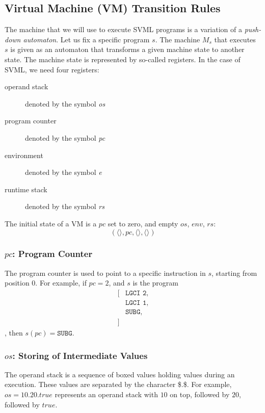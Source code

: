 \begin{appendices}
\subsection{Virtual Machine (VM) Transition Rules}
\label{sec:org7e77008}
The machine that we will use to execute SVML programs is a variation of a \emph{push-down automaton}. Let us fix a specific program \(s\). The machine \(M_s\) that executes \(s\) is given as an automaton that transforms a given machine state to another state. The machine state is represented by so-called registers.
In the case of SVML, we need four registers:
\begin{description}
\item[{operand stack}] denoted by the symbol \textit{os}
\item[{program counter}] denoted by the symbol \textit{pc}
\item[{environment}] denoted by the symbol \textit{e}
\item[{runtime stack}] denoted by the symbol \textit{rs}
\end{description}
The initial state of a VM is a \(\textit{pc}\) set to zero, and empty \(\textit{os}\), \(\textit{env}\), \(\textit{rs}\):
$$(\langle \rangle, \textit{pc}, \langle \rangle, \langle \rangle)$$

\subsubsection{\(\textit{pc}\): Program Counter}
\label{sec:org92c6cf6}
The program counter is used to point to a specific instruction in \(s\), starting from position 0.
For example, if \(\textit{pc} = 2\), and \(s\) is the program
$$\begin{aligned}
\lbrack&\texttt{LGCI 2},\\
&\texttt{LGCI 1},\\
&\texttt{SUBG},\\
\rbrack
\end{aligned}$$
, then \(s(\textit{pc}) = \texttt{SUBG}\).

\subsubsection{\(\textit{os}\): Storing of Intermediate Values}
\label{sec:orgb219984}
The operand stack is a sequence of boxed values holding values during an execution. These values are separated by the character \$.\$.
For example, \(\textit{os} = 10.20.\textit{true}\) represents an operand stack with \(10\) on top, followed by \(20\), followed by \(\textit{true}\).


\end{appendices}
